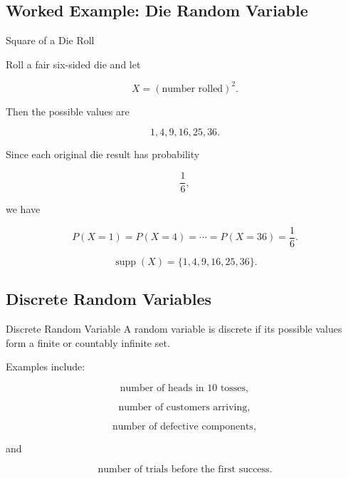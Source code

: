 \subsection{Worked Example: Die Random Variable}
\label{subsec:worked-die-rv}

\begin{workedexamplebox}{Square of a Die Roll}

Roll a fair six-sided die and let

\[
X
=
(\text{number rolled})^2.
\]

Then the possible values are

\[
1,4,9,16,25,36.
\]

Since each original die result has probability

\[
\frac16,
\]

we have

\[
P(X=1)
=
P(X=4)
=
\cdots
=
P(X=36)
=
\frac16.
\]

\begin{answerbox}
\[
\boxed{
\operatorname{supp}(X)
=
\{1,4,9,16,25,36\}.
}
\]
\end{answerbox}

\end{workedexamplebox}

\subsection{Discrete Random Variables}
\label{subsec:discrete-random-variables}

\begin{definitionbox}{Discrete Random Variable}
A random variable is discrete if its possible values form a finite or
countably infinite set.
\end{definitionbox}

Examples include:

\[
\text{number of heads in \(10\) tosses},
\]

\[
\text{number of customers arriving},
\]

\[
\text{number of defective components},
\]

and

\[
\text{number of trials before the first success}.
\]

